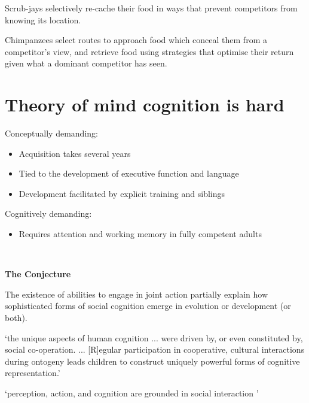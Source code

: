 \documentclass[11pt]{extarticle}
\begin{document}
\begin{multicols}{3}
Scrub-jays selectively re-cache their food in ways that prevent competitors from knowing its location.\citep{Clayton:2007fh}

Chimpanzees select routes to approach food which conceal them from a competitor’s view,\citep{Hare:2006ih} and retrieve food using strategies that optimise their return given what a dominant competitor has seen.\citep{Hare:2001ph}



\section{Theory of mind cognition is hard}
Conceptually demanding:
\begin{itemize}\itemsep0pt
\item Acquisition takes several years\citep{Wimmer:1983dz,Wellman:2001lz}
\item Tied to the development of executive function\citep{Perner:1999yr,Sabbagh:2006ke} and language\citep{Astington2005ot}
\item Development facilitated by explicit training\citep{Slaughter:1996fv} and siblings\citep{Clements:2000nc,Hughes:2004zj}
\end{itemize}
%
Cognitively demanding: 
\begin{itemize}
\item Requires attention and working memory in fully competent adults\citep{Apperly:2008jv,McKinnon:2007rr}
\end{itemize}


\

\begin{center}
{\Large
\textbf{The Conjecture}
}
\end{center}

The existence of abilities to engage in joint action partially explain how sophisticated forms of social cognition emerge in evolution or development (or both).


`the unique aspects of human cognition ... were driven by, or even constituted by, social co-operation. ...
[R]egular participation in cooperative, cultural interactions during ontogeny leads children to construct uniquely powerful forms of cognitive representation.'
\citep%
{Moll:2007gu}



`perception, action, and cognition are grounded in social interaction%
'\citep%
{Knoblich:2006bn}



\end{multicols}
\end{document}
